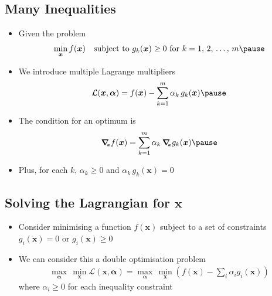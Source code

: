 \begin{slide}
\section[-2]{Many Inequalities}

\begin{PauseHighLight}
  \begin{itemize}\squeeze
  \item Given the problem
    \begin{align*}
      \min_{\bm{x}} f(\bm{x}) \quad \mbox{subject to $g_k(\bm{x})\geq 0$ for
      $k=1,\,2,\,\ldots,\,m$}\pause
    \end{align*}
  \item We introduce multiple Lagrange multipliers
    \begin{align*}
      \mathcal{L}(\bm{x},\bm{\alpha}) = f(\bm{x}) - \sum_{k=1}^m \alpha_k\,
      g_k(\bm{x})\pause 
    \end{align*}
  \item The condition for an optimum is
    \begin{align*}
      \gradx f(\bm{x}) = \sum_{k=1}^m  \alpha_k \, \gradx g_k(\bm{x})\pause
    \end{align*}
  \item Plus, for each $k$, $\alpha_k\geq0$ and $\alpha_k\,g_k(\bm{x})=0$\pause
  \end{itemize}
\end{PauseHighLight}

\end{slide}


\Outline %

\begin{slide}
\section{Solving the Lagrangian for $\bm{x}$}

\begin{PauseHighLight}
  \begin{itemize}
  \item Consider minimising a function $f(\bm{x})$ subject to a set of
    constraints $g_i(\bm{x})=0$ or $g_i(\bm{x})\geq 0$\pause
  \item We can consider this a double optimisation problem
    \begin{align*}
      \max_{\bm{\alpha}} \, \min_{\bm{x}} \mathcal{L}(\bm{x},\bm{\alpha})
      = \max_{\bm{\alpha}} \, \min_{\bm{x}} \left( f(\bm{x}) - \sum_i \alpha_i
      g_i(\bm{x}) \right)
    \end{align*}
    where $\alpha_i\geq0$ for each inequality constraint\pause
  \end{itemize}
\end{PauseHighLight}

\end{slide}

